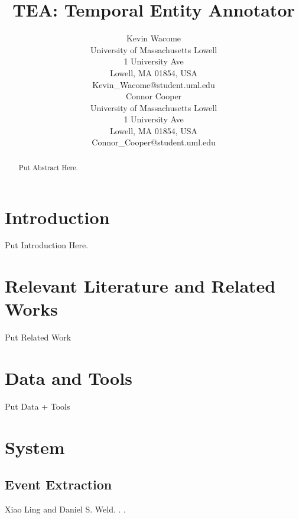 \documentclass[11pt,letterpaper]{article}
\title{TEA: Temporal Entity Annotator}
\author{Kevin Wacome\\
	    University of Massachusetts Lowell\\
	    1 University Ave\\
	    Lowell, MA 01854, USA\\
	    Kevin\_Wacome@student.uml.edu\\
	  \And
		Connor Cooper\\
	  	University of Massachusetts Lowell\\
	  	1 University Ave\\
	  	Lowell, MA 01854, USA\\
		Connor\_Cooper@student.uml.edu\\}
\begin{document}
\maketitle
\begin{abstract}
Put Abstract Here.
\end{abstract}

\section{Introduction}

Put Introduction Here.


\section{Relevant Literature and Related Works}

Put Related Work

\section{Data and Tools}

Put Data + Tools

\section{System}

\subsection{Event Extraction}

\begin{thebibliography}{}

Xiao Ling and Daniel S. Weld.
.
.




\end{thebibliography}
\end{document}
